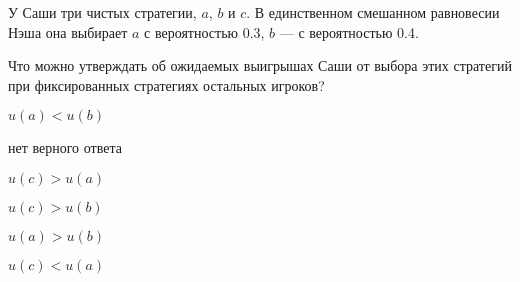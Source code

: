
\begin{question}
У Саши три чистых стратегии, \(a\), \(b\) и \(c\). В единственном
смешанном равновесии Нэша она выбирает \(a\) с вероятностью 0.3, \(b\)
--- с вероятностью 0.4.

Что можно утверждать об ожидаемых выигрышах Саши от выбора этих
стратегий при фиксированных стратегиях остальных игроков?
\begin{answerlist}
  \item \(u(a) < u(b)\)
  \item нет верного ответа
  \item \(u(c) > u(a)\)
  \item \(u(c) > u(b)\)
  \item \(u(a) > u(b)\)
  \item \(u(c) < u(a)\)
\end{answerlist}
\end{question}


